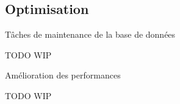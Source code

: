 
\subsection{Optimisation}


\begin{frame}[fragile]{Tâches de maintenance de la base de données}

   TODO
   WIP

\begin{toile}
\end{toile}

\end{frame}


\begin{frame}[fragile]{Amélioration des performances}

   TODO
   WIP

\begin{toile}
\end{toile}

\end{frame}



